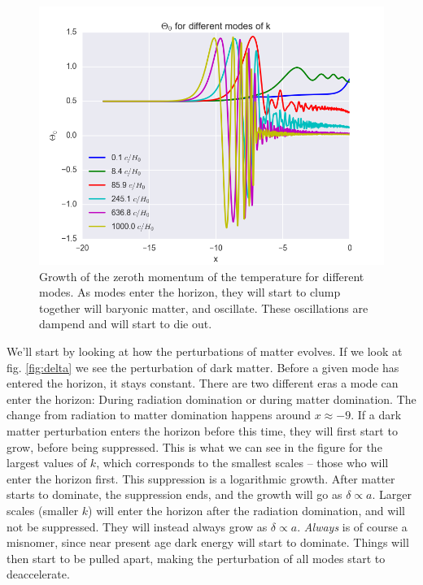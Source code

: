 \documentclass[a4paper,norsk, 10pt]{article}
\begin{document}
\begin{figure}[!htbp]
\centering
\includegraphics[scale=0.5]{Theta_0.png}
\caption{Growth of the zeroth momentum of the temperature for different modes. As modes enter the horizon, they will start to clump  together will baryonic matter, and oscillate. These oscillations are dampend and will start to die out.}\label{fig:theta}
\end{figure}




We'll start by looking at how the perturbations of matter evolves. If we look at fig. \ref{fig:delta} we see the perturbation of dark matter. Before a given mode has entered the horizon, it stays constant. There are two different eras a mode can enter the horizon: During radiation domination or during matter domination. The change from radiation to matter domination happens around $x\approx -9$. If a dark matter perturbation enters the horizon before this time, they will first start to grow, before being suppressed. This is what we can see in the figure for the largest values of $k$, which corresponds to the smallest scales -- those who will enter the horizon first. This suppression is a logarithmic growth. After matter starts to dominate, the suppression ends, and the growth will go as $\delta \propto a$. Larger scales (smaller $k$) will enter the horizon after the radiation domination, and will not be suppressed. They will instead always grow as $\delta \propto a$. \textit{Always} is of course a misnomer, since near present age dark energy will start to dominate. Things will then start to be pulled apart, making the perturbation of all modes start to deaccelerate. 
\end{document}
